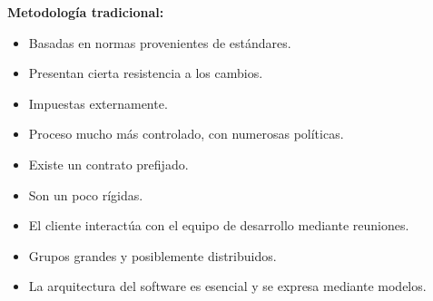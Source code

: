 \documentclass[twoside]{article}
\begin{document}
\begin{multicols}{2}
\textbf{Metodolog\'ia tradicional:} 
\begin{itemize}
\item Basadas en normas provenientes de est\'andares. 
\item Presentan cierta resistencia a los cambios. 
\item Impuestas externamente. 
\item Proceso mucho m\'as controlado, con numerosas pol\'iticas. 
\item Existe un contrato prefijado. 
\item Son un poco r\'igidas. 
\item El cliente interact\'ua con el equipo de desarrollo mediante reuniones. 
\item Grupos grandes y posiblemente distribuidos. 
\item La arquitectura del software es esencial y se expresa mediante modelos. 

\end{itemize}


\end{multicols}
\end{document}
